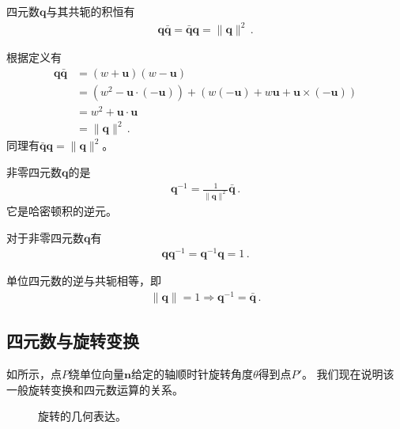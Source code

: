 \begin{proposition}
    四元数${\bm q}$与其共轭的积恒有
    \begin{align}
        {\bm q}\bar{\bm q}=\bar{\bm q}{\bm q}=\|{\bm q}\|^2\, .
    \end{align}
\end{proposition}
\begin{prove}
    根据定义有
    \begin{align}
        {\bm q}\bar{\bm q} & =(w+{\bm u})(w-{\bm u})\nonumber                                                      \\
                           & =(w^2-{\bm u}\cdot(-{\bm u}))+(w(-{\bm u})+w{\bm u}+{\bm u}\times(-{\bm u}))\nonumber \\
                           & =w^2+{\bm u}\cdot{\bm u}\nonumber                                                     \\
                           & =\|{\bm q}\|^2\, .
    \end{align}
    同理有$\bar{\bm q}{\bm q}=\|{\bm q}\|^2$。
\end{prove}
\begin{definition}
    非零四元数${\bm q}$的是
    \begin{align}
        {\bm q}^{-1}=\frac{1}{\|{\bm q}\|^2}\bar{\bm q}\, .
    \end{align}
    它是哈密顿积的逆元。
\end{definition}
\begin{corollary}
    对于非零四元数${\bm q}$有
    \begin{align}
        {\bm q}{\bm q}^{-1}={\bm q}^{-1}{\bm q}=1\, .
    \end{align}
\end{corollary}
\begin{corollary}
    单位四元数的逆与共轭相等，即
    \begin{align}
        \|{\bm q}\|=1 \Rightarrow {\bm q}^{-1}=\bar{\bm q}\, .
    \end{align}
\end{corollary}

\subsection{四元数与旋转变换}\label{sub:四元数与旋转变换}
如所示，点$P$绕单位向量$\bm n$给定的轴顺时针旋转角度$\theta$得到点$P'$。
我们现在说明该一般旋转变换和四元数运算的关系。
\begin{figure}[htbp]
    \centering
    \caption{旋转的几何表达。}
    \label{fig:2.ex1}
\end{figure}

